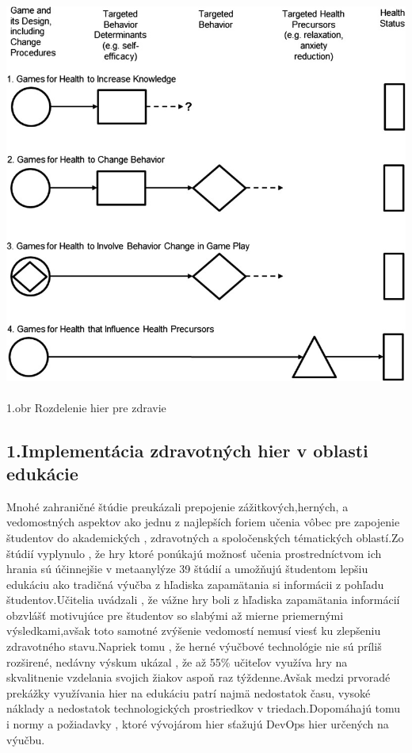 \documentclass[10pt,oneside,slovak,a4paper]{article}
\begin{document}
\paragraph{\includegraphics[scale=2]{tps_1.jpeg}}
\caption{1.obr Rozdelenie hier pre zdravie}

\subsection{1.Implementácia zdravotných hier v oblasti edukácie}
Mnohé zahraničné štúdie preukázali prepojenie zážitkových,herných, a vedomostných aspektov ako jednu z najlepších foriem učenia vôbec pre zapojenie študentov do akademických , zdravotných a spoločenských tématických oblastí.Zo štúdií vyplynulo , že hry ktoré ponúkajú možnosť učenia prostredníctvom ich hrania sú účinnejšie v metaanylýze 39 štúdií a umožňujú študentom lepšiu edukáciu ako tradičná výučba z hľadiska zapamätania si informácii z pohľadu študentov.Učitelia uvádzali , že vážne hry boli z hľadiska zapamätania informácií obzvlášť motivujúce pre študentov so slabými až mierne priemernými výsledkami,avšak toto samotné zvýšenie vedomostí nemusí viesť ku zlepšeniu zdravotného stavu.Napriek tomu , že herné výučbové technológie nie sú príliš rozširené, nedávny výskum ukázal , že až 55\% učiteľov využíva hry na skvalitnenie vzdelania svojich žiakov aspoň raz týždenne.Avšak medzi prvoradé prekážky využívania hier na edukáciu patrí najmä nedostatok času, vysoké náklady a nedostatok technologických prostriedkov v triedach.Dopomáhajú tomu i normy a požiadavky , ktoré vývojárom hier sťažujú DevOps hier určených na výučbu.
\end{document}

